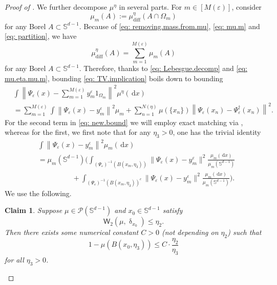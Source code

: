 \documentclass[a4paper,11pt]{article}
\theoremstyle{plain}
\newtheorem{claim}{Claim}
\newcommand{\diff}{\, \mathrm{d}}
\renewcommand{\S}{\mathbb{S}^{d-1}}
\renewcommand{\leq}{\leqslant}
\numberwithin{equation}{section}
\begin{document}
\begin{proof}[Proof of ]
We further decompose $\mu^\eta$ in several parts. For $m\in[M(\varepsilon)]$, consider 
\begin{equation}\label{eq: mu.m}
    \mu_m(A):=\mu^\eta_{\text{diff}}(A\cap\Omega_m)
\end{equation}
for any Borel $A\subset \S$. 
Because of \eqref{eq: removing.mass.from.mu}, \eqref{eq: mu.m} and \eqref{eq: partition}, we have
\begin{equation} \label{eq: mu.eta.mu.m}
    \mu^\eta_{\mathrm{diff}}(A) = \sum_{m=1}^{M(\varepsilon)} \mu_m(A)
\end{equation}
for any Borel $A\subset \S$. Therefore, thanks to \eqref{eq: Lebesgue.decomp} and \eqref{eq: mu.eta.mu.m}, bounding \eqref{eq: TV.implication} boils down to bounding
\begin{align}
    &\int \left\|\Psi_\varepsilon(x)-\sum_{m=1}^{M(\varepsilon)}y_m^\varepsilon 1_{\Omega_m}\right\|^2\mu^\eta(\diff x)\nonumber\\
    &=\sum_{m=1}^{M(\varepsilon)}\int\left\|\Psi_\varepsilon(x)-y_m^\varepsilon\right\|^2\mu_m+\sum_{n=1}^{N(\eta)}\mu(\{x_n\})\left\|\Psi_\varepsilon(x_n)-\Psi^\dagger_\varepsilon(x_n)\right\|^2.\label{eq: new.bound}
\end{align}
For the second term in \eqref{eq: new.bound} we will employ exact matching via , whereas for the first, we first note that for any $\eta_3>0$, one has the  trivial identity
\begin{align}
    &\int\left\|\Psi_\varepsilon(x)-y_m^\varepsilon\right\|^2\mu_m(\diff x)\nonumber\\
    &=\mu_m(\S)\Bigg(\int_{(\Psi_\varepsilon)^{-1}(B(x_m,\eta_3))} \|\Psi_\varepsilon(x)-y_m^\varepsilon\|^2\frac{\mu_m(\diff x)}{\mu_m(\S)}\nonumber\\&\hspace{2cm}+\int_{(\Psi_\varepsilon)^{-1}(B(x_m,\eta_3))^c} \|\Psi_\varepsilon(x)-y_m^\varepsilon\|^2\frac{\mu_m(\diff x)}{\mu_m(\S)}\Bigg)\label{eq: trivial.split}.
\end{align}
We use the following.

\begin{claim}\label{cl: W.to.ball}
Suppose $\mu\in\mathscr{P}(\S)$ and $x_0\in \S$  satisfy
\begin{equation*}
    \mathsf{W}_2(\mu,\updelta_{x_0})\leq\eta_2.
\end{equation*}
Then there exists some numerical constant $C>0$ (not depending on $\eta_2$) such that
\begin{equation*}
    1-\mu(B(x_0,\eta_3))\leq C\cdot\frac{\eta_2}{\eta_3}
\end{equation*}
for all $\eta_3>0$.
\end{claim}


\end{proof}
\end{document}
